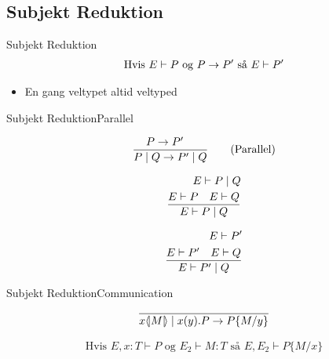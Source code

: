 \subsection{Subjekt Reduktion}
\begin{frame}{Subjekt Reduktion}
\begin{align*}
\text{Hvis } E \vdash P \text{ og } P \rightarrow P' \text{ så } E \vdash P'
\end{align*}
\begin{itemize}
\item En gang veltypet altid veltyped
\end{itemize}
\end{frame}

\begin{frame}{Subjekt Reduktion}{Parallel}

\begin{align*}
\frac{P \rightarrow P' \quad}{P \mid Q \rightarrow P' \mid Q} \tag{Parallel}\\
\end{align*}

\begin{align*}
E \vdash P \mid Q\\
\frac{E \vdash P \quad E \vdash Q}{E \vdash P \mid Q}\\
\end{align*}

\begin{align*}
E \vdash P'\\
\frac{E \vdash P' \quad E \vdash Q}{E \vdash P' \mid Q}
\end{align*}

\end{frame}

\begin{frame}{Subjekt Reduktion}{Communication}
\begin{align*}
\frac{}{x \langle \! | M | \! \rangle \mid x(y).P \rightarrow P\{M/y\}}
\end{align*}

\begin{align*}
\tag{Lemma substitution} \text{Hvis } E,x:T \vdash P \text{ og } E_2 \vdash M:T \text{ så } E,E_2\vdash P\{M/x\}
\end{align*}

\end{frame}

